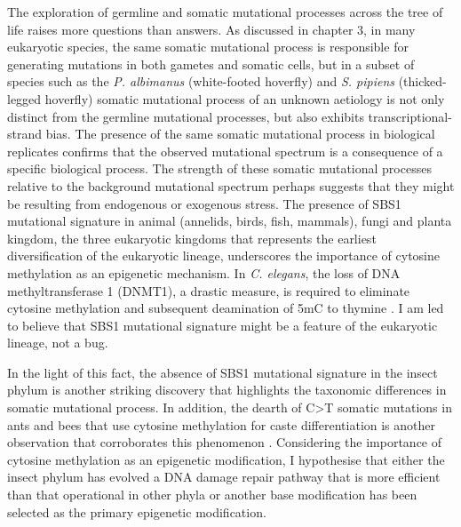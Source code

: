The exploration of germline and somatic mutational processes across the tree of life raises more questions than answers. As discussed in chapter 3, in many eukaryotic species, the same somatic mutational process is responsible for generating mutations in both gametes and somatic cells, but in a subset of species such as the \textit{P. albimanus} (white-footed hoverfly) and \textit{S. pipiens} (thicked-legged hoverfly) somatic mutational process of an unknown aetiology is not only distinct from the germline mutational processes, but also exhibits transcriptional-strand bias. The presence of the same somatic mutational process in biological replicates confirms that the observed mutational spectrum is a consequence of a specific biological process. The strength of these somatic mutational processes relative to the background mutational spectrum perhaps suggests that they might be resulting from endogenous or exogenous stress. 
The presence of SBS1 mutational signature in animal (annelids, birds, fish, mammals), fungi and planta kingdom, the three eukaryotic kingdoms that represents the earliest diversification of the eukaryotic lineage, underscores the importance of cytosine methylation as an epigenetic mechanism. In \textit{C. elegans}, the loss of DNA methyltransferase 1 (DNMT1), a drastic measure, is required to eliminate cytosine methylation and subsequent deamination of 5mC to thymine \cite{}. I am led to believe that SBS1 mutational signature might be a feature of the eukaryotic lineage, not a bug.

In the light of this fact, the absence of SBS1 mutational signature in the insect phylum is another striking discovery that highlights the taxonomic differences in somatic mutational process. In addition, the dearth of C>T somatic mutations in ants and bees that use cytosine methylation for caste differentiation is another observation that corroborates this phenomenon \cite{}. Considering the importance of cytosine methylation as an epigenetic modification, I hypothesise that either the insect phylum has evolved a DNA damage repair pathway that is more efficient than that operational in other phyla or another base modification has been selected as the primary epigenetic modification. 

